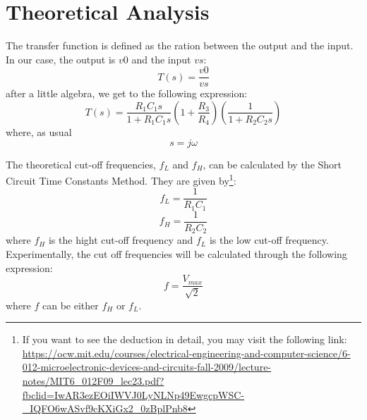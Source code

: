 \section{Theoretical Analysis}
\label{sec:analysis}



The transfer function is defined as the ration between the output and the input. In our case, the output is $v0$ and the input $vs$:
\begin{equation*}
    T(s)=\frac{v0}{vs}
\end{equation*}
after a little algebra, we get to the following expression:
\begin{equation}
    T(s)=\frac{R_{1}C_{1}s}{1+R_{1}C_{1}s} (1 + \frac{R_{3}}{R_4}) (\frac{1}{1+ R_{2} C_{2}s}) 
\end{equation}
where, as usual
\begin{equation*}
    s = j\omega
\end{equation*}


The theoretical cut-off frequencies, $f_L$ and $f_H$, can be calculated by the Short Circuit Time Constants Method. They are given by\footnote{If you want to see the deduction in detail, you may visit the following link: \url{https://ocw.mit.edu/courses/electrical-engineering-and-computer-science/6-012-microelectronic-devices-and-circuits-fall-2009/lecture-notes/MIT6_012F09_lec23.pdf?fbclid=IwAR3ezEOiIWVJ0LyNLNp49EwgcpWSC-_IQFO6wASvf9cKXiGx2_0zBplPnb8}}:
\begin{equation}
    f_L = \frac{1}{R_1C_1}
\end{equation}
\begin{equation}
    f_H = \frac{1}{R_2C_2}
\end{equation}
where $f_H$ is the hight cut-off frequency and $f_L$ is the low cut-off frequency.
Experimentally, the cut off frequencies will be calculated through the following expression:
\begin{equation*}
    f = \frac{V_{max}}{\sqrt{2}}
\end{equation*}
where $f$ can be either $f_H$ or $f_L$.